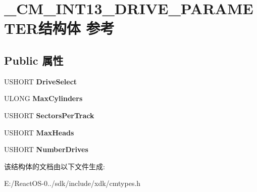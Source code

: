 \hypertarget{struct___c_m___i_n_t13___d_r_i_v_e___p_a_r_a_m_e_t_e_r}{}\section{\+\_\+\+C\+M\+\_\+\+I\+N\+T13\+\_\+\+D\+R\+I\+V\+E\+\_\+\+P\+A\+R\+A\+M\+E\+T\+E\+R结构体 参考}
\label{struct___c_m___i_n_t13___d_r_i_v_e___p_a_r_a_m_e_t_e_r}
\subsection*{Public 属性}
\begin{DoxyCompactItemize}
\item 
\mbox{\label{struct___c_m___i_n_t13___d_r_i_v_e___p_a_r_a_m_e_t_e_r_ac669f958fd95d6b41ba14b6fe034df2d}} 
U\+S\+H\+O\+RT {\bfseries Drive\+Select}
\item 
\mbox{\label{struct___c_m___i_n_t13___d_r_i_v_e___p_a_r_a_m_e_t_e_r_a0bafd4d709fbe9c5c09f873d6937333e}} 
U\+L\+O\+NG {\bfseries Max\+Cylinders}
\item 
\mbox{\label{struct___c_m___i_n_t13___d_r_i_v_e___p_a_r_a_m_e_t_e_r_a50f60e1958d7cf48dbfc6155dc2380c1}} 
U\+S\+H\+O\+RT {\bfseries Sectors\+Per\+Track}
\item 
\mbox{\label{struct___c_m___i_n_t13___d_r_i_v_e___p_a_r_a_m_e_t_e_r_a43c542d95df56881121ec9c5a9c33ef9}} 
U\+S\+H\+O\+RT {\bfseries Max\+Heads}
\item 
\mbox{\label{struct___c_m___i_n_t13___d_r_i_v_e___p_a_r_a_m_e_t_e_r_ac04fca44ebfe4f76b826abf7472c6015}} 
U\+S\+H\+O\+RT {\bfseries Number\+Drives}
\end{DoxyCompactItemize}


该结构体的文档由以下文件生成\+:\begin{DoxyCompactItemize}
\item 
E\+:/\+React\+O\+S-\/0../sdk/include/xdk/cmtypes.\+h\end{DoxyCompactItemize}
